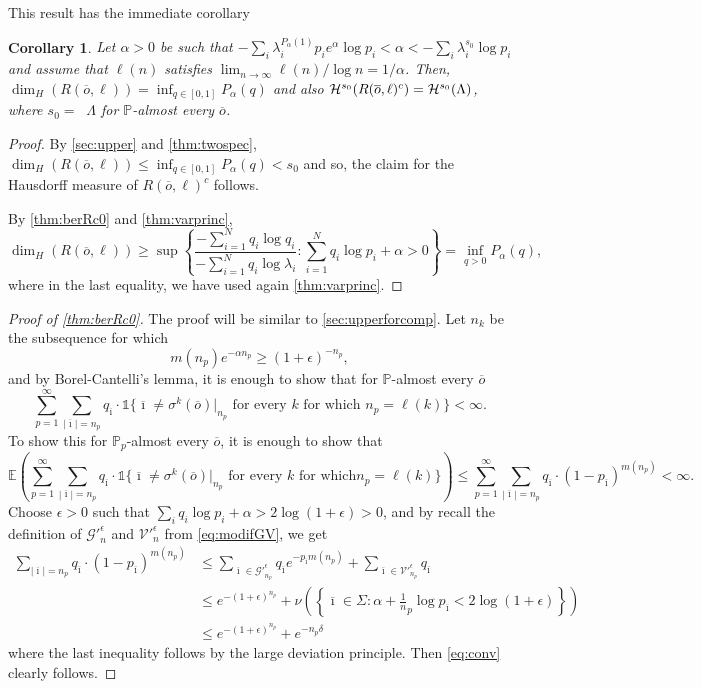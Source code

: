 \documentclass[12pt,]{article}
\newtheorem{corollary}[theorem]{Corollary}
\theoremstyle{definition}
\theoremstyle{remark}
\renewcommand{\Bbb}[1]{\mathbb{#1}}
\newcommand{\bbE}{{\Bbb E}}
\newcommand{\bbP}{{\Bbb P}}
\newcommand{\cH}{{\cal H}}
\newcommand{\0}{\mathbf{0}}
\newcommand{\bi}{{\overline {\imath}}}
\newcommand{\bo}{{\overline o}}
\DeclareMathOperator{\dimh}{\dim_H}
\begin{document}
This result has the immediate corollary

\begin{corollary}\label{thm:spectrumregion}
  Let $\alpha>0$ be such that $-\sum_i\lambda_i^{P_\alpha(1)}p_ie^\alpha\log
  p_i<\alpha<-\sum_i\lambda_i^{s_0}\log p_i$ and assume that $\ell(n)$ satisfies
  $\lim_{n\to\infty}\ell(n)/\log n = 1/\alpha$. Then, $\dim_H(R(\bo,\ell))
  =\inf_{q\in[0,1]}P_\alpha(q)$ and also $\cH^{s_0}(R(\bo,\ell)^c)=\cH^{s_0}(\Lambda)$, where $s_0 =
  \dimh \Lambda$ for $\bbP$-almost every $\bo$.
\end{corollary}

\begin{proof}
  By \cref{sec:upper} and \cref{thm:twospec}, $\dim_H(R(\bo,\ell))
  \leq\inf_{q\in[0,1]}P_\alpha(q)<s_0$ and so, the claim for the Hausdorff measure of
  $R(\bo,\ell)^c$ follows.

  By \cref{thm:berRc0} and \cref{thm:varprinc},
  $$
  \dim_H(R(\bo,\ell))\geq\sup\left\{\frac{-\sum_{i=1}^Nq_i\log q_i}{-\sum_{i=1}^Nq_i\log\lambda_i} :
  \sum_{i=1}^Nq_i\log p_i+\alpha>0\right\}=\inf_{q>0}P_\alpha(q),
  $$
  where in the last equality, we have used again \cref{thm:varprinc}.
\end{proof}

\begin{proof}[Proof of \cref{thm:berRc0}]
  The proof will be similar to \cref{sec:upperforcomp}.  Let $n_k$ be the subsequence for which
  $$
  m(n_p)e^{-\alpha n_p}\geq(1+\epsilon)^{-n_p},
  $$
  and by Borel-Cantelli's lemma, it is enough to show that for $\bbP$-almost every $\bo$
  $$
  \sum_{p=1}^\infty\sum_{|\bi|=n_p}q_{\bi}\cdot\mathbb 1\{\bi\neq\sigma^k(\bo)|_{n_p} \text{ for
  every $k$ for which }n_p=\ell(k)\}<\infty.
  $$
  To show this for $\bbP_p$-almost every $\bo$, it is enough to show that
  \begin{equation}\label{eq:conv}
    \bbE\left(\sum_{p=1}^\infty\sum_{|\bi|=n_p}q_{\bi}\cdot\mathbb 1\{\bi\neq\sigma^k(\bo)|_{n_p}
    \text{ for every $k$ for which
}n_p=\ell(k)\}\right)\leq\sum_{p=1}^\infty\sum_{|\bi|=n_p}q_{\bi}\cdot(1-p_{\bi})^{m(n_p)}<\infty.
  \end{equation}
  Choose $\epsilon>0$ such that $\sum_iq_i\log p_i+\alpha>2\log(1+\epsilon)>0$, and by recall the
  definition of $\mathcal{G'}_n^\epsilon$ and $\mathcal{V'}_n^\epsilon$ from \cref{eq:modifGV}, we
  get
  \[\begin{split}
    \sum_{|\bi|=n_p}q_{\bi}\cdot(1-p_{\bi})^{m(n_p)}
    &\leq\sum_{\bi\in\mathcal{G'}_{n_p}^\epsilon}q_{\bi}e^{-p_{\bi}m(n_p)}+\sum_{\bi\in\mathcal{V'}_{n_p}^\epsilon}q_{\bi}\\
    &\leq e^{-(1+\epsilon)^{n_p}}+\nu\left(\left\{\bi\in\Sigma: \alpha+\tfrac1n_p\log p_{\bi}<2\log(1+\epsilon)\right\}\right)\\
    &\leq e^{-(1+\epsilon)^{n_p}}+e^{-n_p\delta}
  \end{split}\]
  where the last inequality follows by the large deviation principle. Then \cref{eq:conv} clearly follows.
\end{proof}
\end{document}
